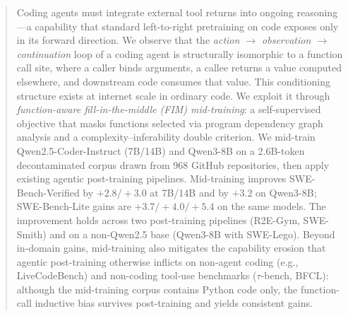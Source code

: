 \vspace{-2.5ex}

\begin{abstract}
Coding agents must integrate external tool returns into ongoing reasoning---a
capability that standard left-to-right pretraining on code exposes only in its
forward direction. We observe that the
\textit{action $\rightarrow$ observation $\rightarrow$ continuation} loop of a
coding agent is structurally isomorphic to a function call site, where a
caller binds arguments, a callee returns a value computed elsewhere, and
downstream code consumes that value. This conditioning structure exists at
internet scale in ordinary code. We exploit it through
\emph{function-aware fill-in-the-middle (FIM) mid-training}: a self-supervised
objective that masks functions selected via program dependency graph
analysis and a complexity--inferability double criterion. We mid-train
Qwen2.5-Coder-Instruct (7B/14B) and Qwen3-8B on a 2.6B-token decontaminated
corpus drawn from 968 GitHub repositories, then apply existing agentic
post-training pipelines.
Mid-training improves SWE-Bench-Verified by $+2.8/+3.0$ at 7B/14B and by
$+3.2$ on Qwen3-8B; SWE-Bench-Lite gains are $+3.7/+4.0/+5.4$ on the same
models. The improvement holds across two post-training pipelines (R2E-Gym,
SWE-Smith) and on a non-Qwen2.5 base (Qwen3-8B with SWE-Lego). Beyond
in-domain gains, mid-training also mitigates the capability erosion that
agentic post-training otherwise inflicts on non-agent coding (e.g.,
LiveCodeBench) and non-coding tool-use benchmarks ($\tau$-bench, BFCL):
although the mid-training corpus contains Python code only, the
function-call inductive bias survives post-training and yields consistent gains.
\end{abstract}

\vspace{-2ex}